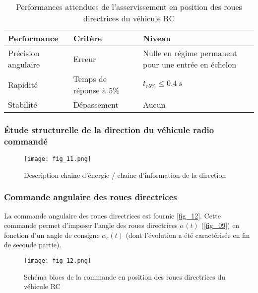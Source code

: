 \begin{table}[H]
\centering
\begin{tabular}{lll}
\hline
Performance &Critère& Niveau \\
\hline 
Précision angulaire & Erreur &Nulle en régime permanent pour une entrée en échelon \\
Rapidité &Temps de réponse à 5\% & $t_{r5\%}\leq \SI{0,4}{s}$ \\
Stabilité &Dépassement &Aucun \\ \hline
\end{tabular}
\caption{Performances attendues de l’asservissement en position des roues directrices du véhicule RC
 \label{tab_02}}
\end{table}

\subsubsection{Étude structurelle de la direction du véhicule radio commandé}

\begin{figure}[H]
\centering
\texttt{[image: fig\_11.png]}
\caption{Description chaine d’énergie / chaine d’information de la direction \label{fig_11}}
\end{figure}

\subsubsection{Commande angulaire des roues directrices}
La commande angulaire des roues directrices est fournie \autoref{fig_12}. Cette commande permet d’imposer l’angle des roues directrices $\alpha(t)$ (\autoref{fig_09}) en fonction d’un angle de consigne $\alpha_c(t)$ (dont l’évolution a été caractérisée en fin de seconde partie).


\begin{figure}[H]
\centering
\texttt{[image: fig\_12.png]}
\caption{Schéma blocs de la commande en position des roues directrices du véhicule RC \label{fig_12}}
\end{figure}

